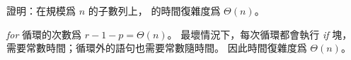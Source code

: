 \startEXERCISE
證明：在規模爲 $n$ 的子數列上，  的時間復雜度爲 $\Theta(n)$。
\stopEXERCISE

\startANSWER
\emph{for} 循環的次數爲 $r - 1 - p = \Theta(n)$。
最壞情況下，每次循環都會執行 \emph{if} 塊，
需要常數時間；循環外的語句也需要常數隨時間。
因此時間復雜度爲 $\Theta(n)$。
\stopANSWER
